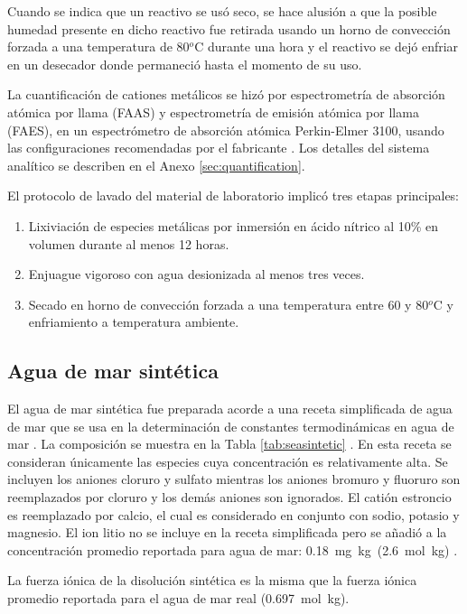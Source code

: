 Cuando se indica que un reactivo se usó {seco}, se hace alusión a que la posible humedad presente en dicho reactivo fue retirada usando un horno de convección forzada a una temperatura de 80$^o$C durante una hora y el reactivo se dejó enfriar en un desecador donde permaneció hasta el momento de su uso.

La cuantificación de cationes metálicos se hizó por espectrometría de absorción atómica por llama (\acs{FAAS}) y espectrometría de emisión atómica por llama (\acs{FAES}), en un espectrómetro de absorción atómica Perkin-Elmer 3100, usando las configuraciones recomendadas por el fabricante \citep{perkin}. Los detalles del sistema analítico se describen en el Anexo \ref{sec:quantification}.

El protocolo de lavado del material de laboratorio implicó tres etapas principales:
\begin{enumerate}
    \item Lixiviación de especies metálicas por inmersión en ácido nítrico al 10\% en volumen durante al menos 12 horas.
    \item Enjuague vigoroso con agua desionizada al menos tres veces.
    \item Secado en horno de convección forzada a una temperatura entre 60 y 80$^o$C y enfriamiento a temperatura ambiente.
\end{enumerate}


\subsection{Agua de mar sintética}
El agua de mar sintética fue preparada acorde a una receta simplificada de agua de mar que se usa en la determinación de constantes termodinámicas en agua de mar \citep{Sun2019}. La composición se muestra en la Tabla \ref{tab:seasintetic} \citep{Dickson1994}. En esta receta se consideran únicamente las especies cuya concentración es relativamente alta. Se incluyen los aniones cloruro y sulfato mientras los aniones bromuro y fluoruro son reemplazados por cloruro y los demás aniones son ignorados. El catión estroncio es reemplazado por calcio, el cual es considerado en conjunto con sodio, potasio y magnesio. El ion litio no se incluye en la receta simplificada pero se añadió a la concentración promedio reportada para agua de mar: 0.18~mg~kg\mnn\ (2.6~mol~kg\mnn) \citep{Evans2013}. 

La fuerza iónica de la disolución sintética es la misma que la fuerza iónica promedio reportada para el agua de mar real (0.697~mol~kg\mnn).

